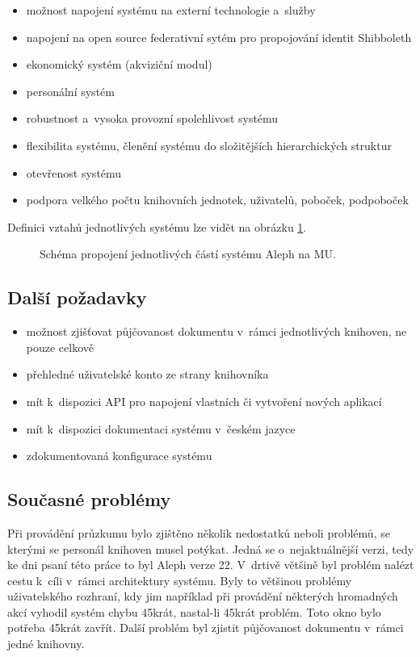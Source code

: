 \documentclass[
	11pt, oneside, printed, final, palatino, monochrome
	microtype,
	table,   %
	lof,     %
	lot     %
]{fithesis3}
\newcommand{\mezera}{\bigskip}
\begin{document}
{\begin{itemize}
\item možnost napojení systému na externí technologie a~služby
\item napojení na open source federativní sytém pro propojování identit Shibboleth
\item ekonomický systém (akviziční modul)
\item personální systém
\item robustnost a~vysoka provozní spolehlivost systému
\item flexibilita systému, členění systému do složitějších hierarchických struktur
\item otevřenost systému
\item podpora velkého počtu knihovních jednotek, uživatelů, poboček, podpoboček
\end{itemize}

Definici vztahů jednotlivých systému lze vidět na obrázku \ref{fig:aleph}.
\mezera

\begin{figure}
    \centering
	\def\svgwidth{1.4\textwidth}
    
	\caption{Schéma propojení jednotlivých částí systému Aleph na MU.}
	\label{fig:aleph}
\end{figure}

\subsection{Další požadavky}

\begin{itemize}
\item možnost zjišťovat půjčovanost dokumentu v~rámci jednotlivých knihoven, ne pouze celkově
\item přehledné uživatelské konto ze strany knihovníka
\item mít k~dispozici API pro napojení vlastních či vytvoření nových aplikací
\item mít k~dispozici dokumentaci systému v~českém jazyce
\item zdokumentovaná konfigurace systému
\end{itemize}


\subsection{Současné problémy}
Při provádění průzkumu bylo zjištěno několik nedostatků neboli problémů, se kterými se personál knihoven musel potýkat. Jedná se o~nejaktuálnější verzi, tedy ke dni psaní této práce to byl Aleph verze 22. V~drtivě většině byl problém nalézt cestu k~cíli v~rámci architektury systému. Byly to většinou problémy uživatelského rozhraní, kdy jim například při provádění některých hromadných akcí vyhodil systém chybu 45krát, nastal-li 45krát problém. Toto okno bylo potřeba 45krát zavřít. Další problém byl zjistit půjčovanost dokumentu v~rámci jedné knihovny.

}
\end{document}
